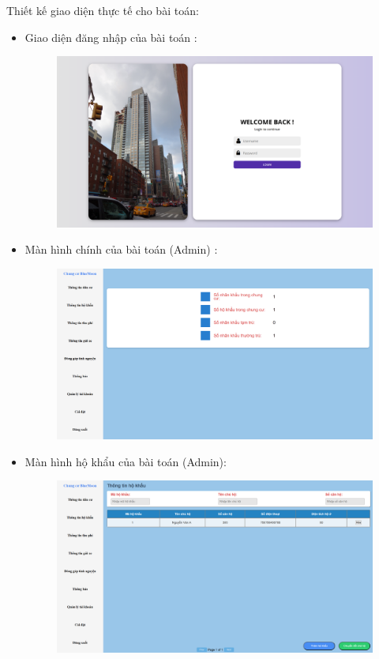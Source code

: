 \documentclass{article}
\begin{document}
Thiết kế giao diện thực tế cho bài toán:
\begin{itemize}
    \item Giao diện đăng nhập của bài toán :
    \begin{figure}[H]
        \centering
        \includegraphics[width=1\textwidth]{Ảnh chương 4/Đăng nhập 1.png}
    \end{figure}
    \vspace{10cm}
    \item Màn hình chính của bài toán (Admin) :
    \begin{figure}[H]
        \centering
        \includegraphics[width=1\textwidth]{Ảnh chương 4/Màn hình chính 1.png}
    \end{figure}
    \item Màn hình hộ khẩu của bài toán (Admin):
    \begin{figure}[H]
        \centering
        \includegraphics[width=1\textwidth]{Ảnh chương 4/Hộ khẩu 1.png}

\end{figure}
\end{itemize}
\end{document}
